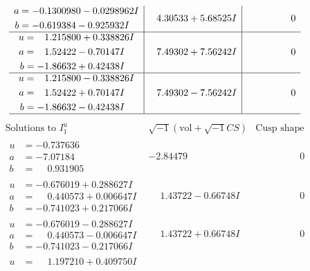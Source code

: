 \documentclass[1p]{elsarticle_modified}
\theoremstyle{definition}
\newcommand{\I}{\sqrt{-1}}
\begin{document}
$$\begin{array}{c|c|c}
\begin{aligned}
a &= -0.1300980 - 0.0298962 I \\
b &= -0.619384 - 0.925932 I\end{aligned}
 & \phantom{-}4.30533 + 5.68525 I & \phantom{-0.000000 } 0 \\ \hline\begin{aligned}
u &= \phantom{-}1.215800 + 0.338826 I \\
a &= \phantom{-}1.52422 - 0.70147 I \\
b &= -1.86632 + 0.42438 I\end{aligned}
 & \phantom{-}7.49302 + 7.56242 I & \phantom{-0.000000 } 0 \\ \hline\begin{aligned}
u &= \phantom{-}1.215800 - 0.338826 I \\
a &= \phantom{-}1.52422 + 0.70147 I \\
b &= -1.86632 - 0.42438 I\end{aligned}
 & \phantom{-}7.49302 - 7.56242 I & \phantom{-0.000000 } 0\\
 \hline 
 \end{array}$$\newpage$$\begin{array}{c|c|c}  
\text{Solutions to }I^u_{1}& \I (\text{vol} + \sqrt{-1}CS) & \text{Cusp shape}\\
 \hline 
\begin{aligned}
u &= -0.737636\phantom{ +0.000000I} \\
a &= -7.07184\phantom{ +0.000000I} \\
b &= \phantom{-}0.931905\phantom{ +0.000000I}\end{aligned}
 & -2.84479\phantom{ +0.000000I} & \phantom{-0.000000 } 0 \\ \hline\begin{aligned}
u &= -0.676019 + 0.288627 I \\
a &= \phantom{-}0.440573 + 0.006647 I \\
b &= -0.741023 + 0.217066 I\end{aligned}
 & \phantom{-}1.43722 - 0.66748 I & \phantom{-0.000000 } 0 \\ \hline\begin{aligned}
u &= -0.676019 - 0.288627 I \\
a &= \phantom{-}0.440573 - 0.006647 I \\
b &= -0.741023 - 0.217066 I\end{aligned}
 & \phantom{-}1.43722 + 0.66748 I & \phantom{-0.000000 } 0 \\ \hline\begin{aligned}
u &= \phantom{-}1.197210 + 0.409750 I \\

\end{aligned}
\end{array}$$
\end{document}

